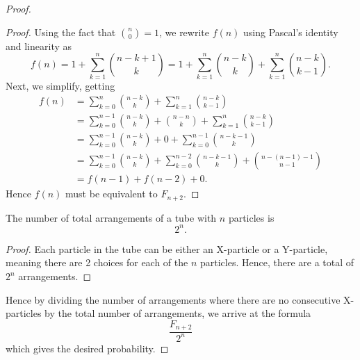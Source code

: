 \begin{proof}
\begin{proof}
  Using the fact that $\binom{n}{0} = 1$, we rewrite $f(n)$ using Pascal's identity and linearity as \[
    f(n) = 1 + \sum_{k=1}^n \binom{n-k+1}{k} = 1 + \sum_{k=1}^n \binom{n-k}{k} + \sum_{k=1}^n \binom{n-k}{k-1}.
  \] Next, we simplify, getting
  \begin{align*}
    f(n) &= \sum_{k=0}^n \binom{n - k}{k} + \sum_{k=1}^n \binom{n-k}{k-1} \\
         &= \sum_{k=0}^{n-1} \binom{n-k}{k} + \binom{n-n}{k} + \sum_{k=1}^n \binom{n-k}{k-1} \\
         &= \sum_{k=0}^{n-1} \binom{n-k}{k} + 0 + \sum_{k=0}^{n-1} \binom{n-k-1}{k} \\
         &= \sum_{k=0}^{n-1} \binom{n-k}{k} + \sum_{k=0}^{n-2} \binom{n-k-1}{k} + \binom{n-(n-1)-1}{n-1} \\
         &= f(n-1) + f(n-2) + 0.
  \end{align*}
  Hence $f(n)$ must be equivalent to $F_{n+2}$.
\end{proof}
\begin{claim}
  The number of total arrangements of a tube with $n$ particles is \[2^n.\]
\end{claim}
\begin{proof}
  Each particle in the tube can be either an X-particle or a Y-particle, meaning there are 2 choices for each of the $n$ particles. Hence, there are a total of $2^n$ arrangements.
\end{proof}
Hence by dividing the number of arrangements where there are no consecutive X-particles by the total number of arrangements, we arrive at the formula \[\frac{F_{n+2}}{2^n}\] which gives the desired probability.
\end{proof}

